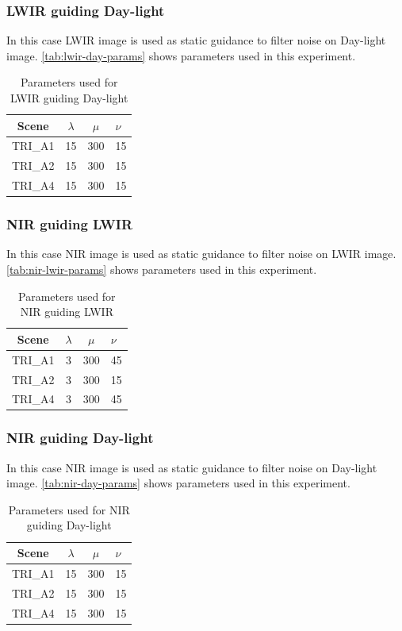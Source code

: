\documentclass[10pt,twocolumn,letterpaper]{article}
\begin{document}
	\subsubsection{LWIR guiding Day-light}
	In this case LWIR image is used as static guidance to filter noise on Day-light image. \autoref{tab:lwir-day-params} shows parameters used in this experiment.
	\begin{table}[!ht]
		\centering
		\caption{Parameters used for LWIR guiding Day-light}
		\label{tab:lwir-day-params}
		\begin{tabular}{@{}cccl@{}}
			\toprule
			\bfseries Scene & \(\lambda\) & \(\mu\) & \(\nu\) \\ \midrule
			TRI\_A1               & 15        	& 300	  & 15       \\
			TRI\_A2               & 15        	& 300	  & 15       \\
			TRI\_A4               & 15        	& 300	  & 15       \\ \bottomrule
		\end{tabular}
	\end{table}
	\subsubsection{NIR guiding LWIR}
	In this case NIR image is used as static guidance to filter noise on LWIR image. \autoref{tab:nir-lwir-params} shows parameters used in this experiment.
	\begin{table}[!ht]
		\centering
		\caption{Parameters used for NIR guiding LWIR}
		\label{tab:nir-lwir-params}
		\begin{tabular}{@{}cccl@{}}
			\toprule
			\bfseries Scene & \(\lambda\) & \(\mu\) & \(\nu\) \\ \midrule
			TRI\_A1               & 3        	& 300	  & 45       \\
			TRI\_A2               & 3        	& 300	  & 15       \\
			TRI\_A4               & 3        	& 300	  & 45       \\ \bottomrule
		\end{tabular}
	\end{table}
	\subsubsection{NIR guiding Day-light}
	In this case NIR image is used as static guidance to filter noise on Day-light image. \autoref{tab:nir-day-params} shows parameters used in this experiment.
	\begin{table}[!ht]
		\centering
		\caption{Parameters used for NIR guiding Day-light}
		\label{tab:nir-day-params}
		\begin{tabular}{@{}cccl@{}}
			\toprule
			\bfseries Scene & \(\lambda\) & \(\mu\) & \(\nu\) \\ \midrule
			TRI\_A1               & 15			& 300	  & 15       \\
			TRI\_A2               & 15			& 300	  & 15        \\
			TRI\_A4               & 15			& 300	  & 15        \\ \bottomrule
		\end{tabular}
	\end{table}
\end{document}
